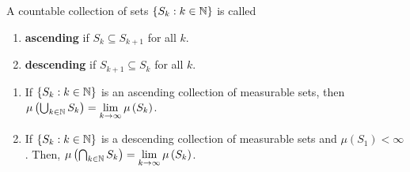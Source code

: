 \begin{definition}
	A countable collection of sets \(\{S_{k} : k \in \mathbb{N}\} \) is called
\begin{enumerate}
	\item \textbf{ascending} if \(S_{k} \subseteq S_{ k + 1}\) for all \(k\).
	\item \textbf{descending} if \(S_{k + 1} \subseteq S_{k}\) for all \(k\).
\end{enumerate}
\end{definition}
\begin{lemma}
	\begin{enumerate}
		\item If \(\{S_{k} : k \in \mathbb{N}\} \) is an ascending collection of measurable sets, then \( \mu \left( \bigcup_{k \in \N} S_{k} \right) = \lim_{k \to \infty} \mu\left( S_{k} \right) \).
		\item If \(\{S_{k} : k \in \mathbb{N}\} \) is a descending collection of measurable sets and \( \mu\left( S_1 \right)  < \infty\). Then, \( \mu \left( \bigcap_{k \in \N} S_{k}  \right) = \lim_{k \to \infty} \mu\left( S_{k} \right)  \).
	\end{enumerate}
\end{lemma}
